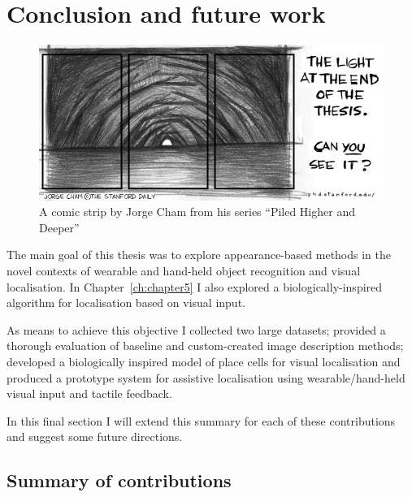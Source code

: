 \chapter{Conclusion and future work}\label{ch:conclusion}

\begin{figure}[h!]
\centering
\includegraphics[width=.8\textwidth]{./gfx/Chapter07/phd051700s.jpg}
\caption{A  comic strip by Jorge Cham from his series ``Piled Higher and Deeper'' \cite{Cham}}
\end{figure}

The main goal of this thesis was to explore appearance-based methods in the novel contexts of wearable and hand-held object recognition and visual localisation. In Chapter~\ref{ch:chapter5} I also explored a biologically-inspired algorithm for localisation based on visual input.

As means to achieve this objective I collected two large datasets; provided a thorough evaluation of baseline and custom-created image description methods; developed a biologically inspired model of place cells for visual localisation and produced a prototype system for assistive localisation using wearable/hand-held visual input and tactile feedback.

In this final section I will extend this summary for each of these contributions and suggest some future directions.

\section{Summary of contributions}

